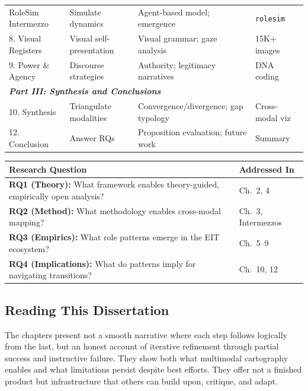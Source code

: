 \documentclass[../main.tex]{subfiles}
\begin{document}
\begin{wideblock}
\begin{tabularx}{0.95\textwidth}{@{}lXXX@{}}
RoleSim Intermezzo & Simulate dynamics & Agent-based model; emergence & \texttt{rolesim} \\[0.4em]
8. Visual Registers & Visual self-presentation & Visual grammar; gaze analysis & 15K+ images \\[0.4em]
9. Power \& Agency & Discourse strategies & Authority; legitimacy narratives & DNA coding \\
\midrule
\multicolumn{4}{l}{\textit{\textbf{Part III: Synthesis and Conclusions}}} \\[0.3em]
10. Synthesis & Triangulate modalities & Convergence/divergence; gap typology & Cross-modal viz \\[0.4em]
12. Conclusion & Answer RQs & Proposition evaluation; future work & Summary \\
\bottomrule
\end{tabularx}
\label{tab:intro:chapter-synthesis}
\end{wideblock}

\begin{center}
\small
\begin{tabular}{@{}p{5.5cm}p{4.5cm}@{}}
\toprule
\textbf{Research Question} & \textbf{Addressed In} \\
\midrule
\textbf{RQ1 (Theory):} What framework enables theory-guided, empirically open analysis? & Ch.~2, 4 \\[0.6em]
\textbf{RQ2 (Method):} What methodology enables cross-modal mapping? & Ch.~3, Intermezzos \\[0.6em]
\textbf{RQ3 (Empirics):} What role patterns emerge in the EIT ecosystem? & Ch.~5--9 \\[0.6em]
\textbf{RQ4 (Implications):} What do patterns imply for navigating transitions? & Ch.~10, 12 \\
\bottomrule
\end{tabular}
\label{tab:intro:rq-mapping}
\end{center}

\subsection{Reading This Dissertation}

The chapters present not a smooth narrative where each step follows logically from the last, but an honest account of iterative refinement through partial success and instructive failure. They show both what multimodal cartography enables and what limitations persist despite best efforts. They offer not a finished product but infrastructure that others can build upon, critique, and adapt.
\end{document}
